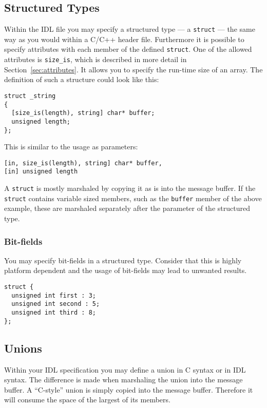 \subsection{Structured Types}
Within the IDL file you may specify a structured type --- a \verb|struct|
 --- the same way as you would within a C/C++ header file. Furthermore
it is possible to specify attributes with each member of the defined
\verb|struct|. One of the allowed attributes is \verb|size_is|, which
is described in more detail in Section~\ref{sec:attributes}. It allows
you to specify the run-time size of an array. The definition of such a
structure could look like this:
\begin{verbatim}
struct _string
{
  [size_is(length), string] char* buffer;
  unsigned length;
};
\end{verbatim}
This is similar to the usage as parameters:
\begin{verbatim}
[in, size_is(length), string] char* buffer,
[in] unsigned length
\end{verbatim}


A \verb|struct| is mostly marshaled by copying it as is into the 
message buffer. If the \verb|struct| contains variable sized members,
such as the \verb|buffer| member of the above example, these are
marshaled separately after the parameter of the structured type.


\subsubsection{Bit-fields}
You may specify bit-fields in a structured type. Consider that this 
is highly platform dependent and the usage of bit-fields may lead
to unwanted results.

\begin{verbatim}
struct {
  unsigned int first : 3;
  unsigned int second : 5;
  unsigned int third : 8;
};
\end{verbatim}

\subsection{Unions}
Within your IDL specification you
may define a union in C syntax or in IDL syntax. The difference is made
when marshaling the union into the message buffer. A ``C-style'' union
is simply copied into the message buffer. Therefore it will consume the
space of the largest of its members.

